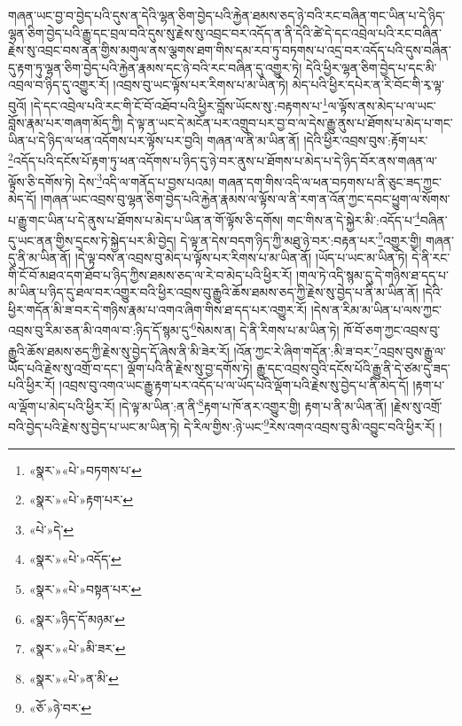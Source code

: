 གཞན་ཡང་བྱ་བ་བྱེད་པའི་དུས་ན་དེའི་ལྷན་ཅིག་བྱེད་པའི་རྐྱེན་ཐམས་ཅད་ཉེ་བའི་རང་བཞིན་གང་ཡིན་པ་དེ་ཉིད་ལྷན་ཅིག་བྱེད་པའི་རྒྱུ་དང་བྲལ་བའི་དུས་སུ་རྗེས་སུ་འབྲང་བར་འདོད་ན་ནི་དེའི་ཚེ་དེ་དང་འབྲེལ་པའི་རང་བཞིན་རྗེས་སུ་འབྲང་བས་ནན་གྱིས་མགུལ་ནས་ལྕགས་ཐག་གིས་དམ་རབ་ཏུ་བཏགས་པ་འདྲ་བར་འདོད་པའི་དུས་བཞིན་དུ་རྟག་ཏུ་ལྷན་ཅིག་བྱེད་པའི་རྐྱེན་རྣམས་དང་ཉེ་བའི་རང་བཞིན་དུ་འགྱུར་ཏེ། དེའི་ཕྱིར་ལྷན་ཅིག་བྱེད་པ་དང་མི་འབྲལ་བ་ཉིད་དུ་འགྱུར་རོ། །འབྲས་བུ་ཡང་ལྟོས་པར་རིགས་པ་མ་ཡིན་ཏེ། མེད་པའི་ཕྱིར་དཔེར་ན་རི་བོང་གི་རྭ་ལྟ་བུའོ། །དེ་དང་འབྲེལ་པའི་རང་གི་ངོ་བོ་འཐོབ་པའི་ཕྱིར་བློས་ཡོངས་སུ་:བརྟགས་པ་\footnote{«སྣར་»«པེ་»བཏགས་པ་}ལ་ལྟོས་ནས་མེད་པ་ལ་ཡང་བློས་རྣམ་པར་གཞག་མོད་ཀྱི། དེ་ལྟ་ན་ཡང་དེ་མངོན་པར་འགྲུབ་པར་བྱ་བ་ལ་དེས་རྒྱུ་ནུས་པ་ཐོགས་པ་མེད་པ་གང་ཡིན་པ་དེ་ཉིད་ལ་ཕན་འདོགས་པར་ལྟོས་པར་བྱའི། གཞན་ལ་ནི་མ་ཡིན་ནོ། །དེའི་ཕྱིར་འབྲས་བུས་:རྟོག་པར་\footnote{«སྣར་»«པེ་»རྟག་པར་}འདོད་པའི་དངོས་པོ་རྟག་ཏུ་ཕན་འདོགས་པ་ཉིད་དུ་ཉེ་བར་ནུས་པ་ཐོགས་པ་མེད་པ་དེ་ཉིད་བོར་ནས་གཞན་ལ་ལྟོས་ཅི་དགོས་ཏེ། དེས་\footnote{«པེ་»དེ་}འདི་ལ་གནོད་པ་བྱས་པའམ། གཞན་དག་གིས་འདི་ལ་ཕན་བཏགས་པ་ནི་ཅུང་ཟད་ཀྱང་མེད་དོ། །གཞན་ཡང་འབྲས་བུ་ལྷན་ཅིག་བྱེད་པའི་རྐྱེན་རྣམས་ལ་ལྟོས་ལ་ནི་རག་ན་འོན་ཀྱང་དབང་ཕྱུག་ལ་སོགས་པ་རྒྱུ་གང་ཡིན་པ་དེ་ནུས་པ་ཐོགས་པ་མེད་པ་ཡིན་ན་གོ་ལྟོས་ཅི་དགོས། གང་གིས་ན་དེ་སྐྱེར་མི་:འདོད་པ་\footnote{«སྣར་»«པེ་»འདོད་}བཞིན་དུ་ཡང་ནན་གྱིས་དྲངས་ཏེ་སྐྱེད་པར་མི་བྱེད། དེ་ལྟ་ན་དེས་བདག་ཉིད་ཀྱི་མཐུ་ཉེ་བར་:བརྟན་པར་\footnote{«སྣར་»«པེ་»བསྟན་པར་}འགྱུར་གྱི། གཞན་དུ་ནི་མ་ཡིན་ནོ། །དེ་ལྟ་བས་ན་འབྲས་བུ་མེད་པ་ལྟོས་པར་རིགས་པ་མ་ཡིན་ནོ། །ཡོད་པ་ཡང་མ་ཡིན་ཏེ། དེ་ནི་རང་གི་ངོ་བོ་མཐའ་དག་ཐོབ་པ་ཉིད་ཀྱིས་ཐམས་ཅད་ལ་རེ་བ་མེད་པའི་ཕྱིར་རོ། །གལ་ཏེ་འདི་སྙམ་དུ་དེ་གཉིས་ཐ་དད་པ་མ་ཡིན་པ་ཉིད་དུ་ཐལ་བར་འགྱུར་བའི་ཕྱིར་འབྲས་བུ་རྒྱུའི་ཆོས་ཐམས་ཅད་ཀྱི་རྗེས་སུ་བྱེད་པ་ནི་མ་ཡིན་ནོ། །དེའི་ཕྱིར་གདོན་མི་ཟ་བར་དེ་གཉིས་རྣམ་པ་འགའ་ཞིག་གིས་ཐ་དད་པར་འགྱུར་རོ། །དེས་ན་རིམ་མ་ཡིན་པ་ལས་ཀྱང་འབྲས་བུ་རིམ་ཅན་མི་འགལ་བ་:ཉིད་དོ་སྙམ་དུ་\footnote{«སྣར་»ཉིད་དོ་མཉམ་}སེམས་ན། དེ་ནི་རིགས་པ་མ་ཡིན་ཏེ། ཁོ་བོ་ཅག་ཀྱང་འབྲས་བུ་རྒྱུའི་ཆོས་ཐམས་ཅད་ཀྱི་རྗེས་སུ་བྱེད་དོ་ཞེས་ནི་མི་ཟེར་རོ། །འོན་ཀྱང་རེ་ཞིག་གདོན་:མི་ཟ་བར་\footnote{«སྣར་»«པེ་»མི་ཟར་}འབྲས་བུས་རྒྱུ་ལ་ཡོད་པའི་རྗེས་སུ་འགྲོ་བ་དང་། ལྡོག་པའི་ནི་རྗེས་སུ་བྱ་དགོས་ཏེ། རྒྱུ་དང་འབྲས་བུའི་དངོས་པོའི་རྒྱུ་ནི་དེ་ཙམ་དུ་ཟད་པའི་ཕྱིར་རོ། །འབྲས་བུ་འགའ་ཡང་རྒྱུ་རྟག་པར་འདོད་པ་ལ་ཡོད་པའི་ལྡོག་པའི་རྗེས་སུ་བྱེད་པ་ནི་མེད་དོ། །རྟག་པ་ལ་ལྡོག་པ་མེད་པའི་ཕྱིར་རོ། །དེ་ལྟ་མ་ཡིན་:ན་ནི་\footnote{«སྣར་»«པེ་»ན་མི་}རྟག་པ་ཁོ་ནར་འགྱུར་གྱི། རྟག་པ་ནི་མ་ཡིན་ནོ། །རྗེས་སུ་འགྲོ་བའི་བྱེད་པའི་རྗེས་སུ་བྱེད་པ་ཡང་མ་ཡིན་ཏེ། དེ་རིལ་གྱིས་:ཉེ་ཡང་\footnote{«ཅོ་»ཉེ་བར་}རེས་འགའ་འབྲས་བུ་མི་འབྱུང་བའི་ཕྱིར་རོ། །
